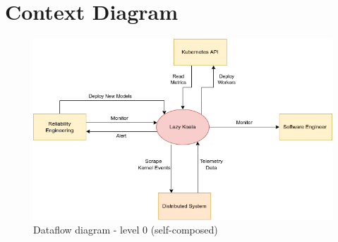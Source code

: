 \section{Context Diagram}

\begin{figure}[H]
    \includegraphics[width=16cm]{assets/requirement-specification/contex-digram.png}
    \caption{Dataflow diagram - level 0 (self-composed)}
\end{figure}
